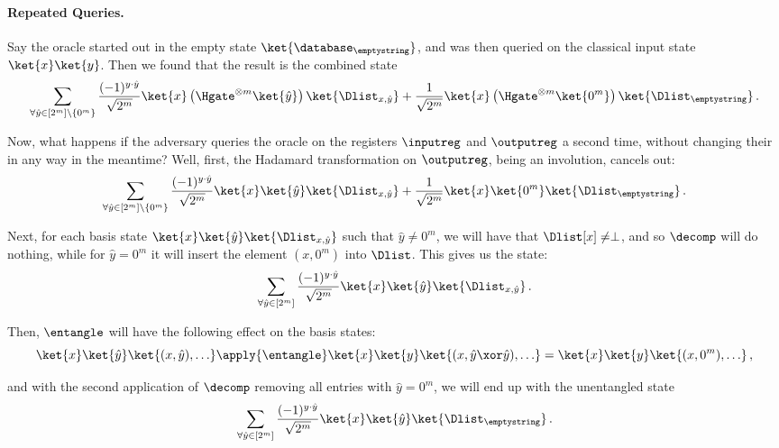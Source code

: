     \paragraph{Repeated Queries.}
      Say the oracle started out in the empty state
        $\ket{\database_\emptystring}$, and was then queried on the classical
        input state $\ket{x}\ket{y}$.
        Then we found that the result is the combined state
      \[
        \sum_{\forall \hat{y} \in [2^m]\backslash \{0^m\}} \frac{(-1)^{y \cdot \hat{y}}}{\sqrt{2^m}}
        \ket{x} \left( \Hgate^{\otimes m} \ket{\hat{y}} \right) \ket{\Dlist_{x,\hat{y}}}
        + \frac{1}{\sqrt{2^m}} \ket{x} \left( \Hgate^{\otimes m} \ket{0^m} \right) \ket{\Dlist_\emptystring}\, . 
      \]

      \noindent
      Now, what happens if the adversary queries the oracle on the registers
        $\inputreg$ and $\outputreg$ a second time, without changing their
        in any way in the meantime? Well, first, the Hadamard transformation on
        $\outputreg$, being an involution, cancels out:
      \[
        \sum_{\forall \hat{y} \in [2^m]\backslash \{0^m\}} \frac{(-1)^{y \cdot \hat{y}}}{\sqrt{2^m}}
        \ket{x} \ket{\hat{y}} \ket{\Dlist_{x,\hat{y}}}
        + \frac{1}{\sqrt{2^m}} \ket{x} \ket{0^m} \ket{\Dlist_\emptystring}\, . 
      \]

      \noindent
      Next, for each basis state $\ket{x} \ket{\hat{y}}
        \ket{\Dlist_{x,\hat{y}}}$ such that $\hat y \neq 0^m$, we will have
        that $\Dlist[x] \neq \perp$, and so $\decomp$ will do nothing,
        while for $\hat y = 0^m$ it will insert the element $(x, 0^m)$ into
        $\Dlist$. This gives us the state:
      \[
        \sum_{\forall \hat{y} \in [2^m]} \frac{(-1)^{y \cdot \hat{y}}}{\sqrt{2^m}}
          \ket{x} \ket{\hat{y}} \ket{\Dlist_{x,\hat{y}}}\, .
      \]

      \noindent
      Then, $\entangle$ will have the following effect on the basis states:
        \[
          \ket{x}\ket{\hat{y}}\ket{(x, \hat{y}), \ldots} \apply{\entangle}
          \ket{x}\ket{y}\ket{(x, \hat{y} \xor \hat{y}), \ldots}
          = \ket{x}\ket{y}\ket{(x, 0^m), \ldots}\, ,
        \]

      \noindent
      and with the second application of $\decomp$ removing all entries with
        $\hat{y} = 0^m$, we will end up with the unentangled state
      \[
        \sum_{\forall \hat{y} \in [2^m]} \frac{(-1)^{y \cdot \hat{y}}}{\sqrt{2^m}}
          \ket{x} \ket{\hat{y}} \ket{\Dlist_\emptystring}\, .
      \]

